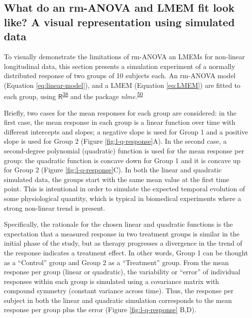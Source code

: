 \documentclass[
]{article}
\begin{document}
\hypertarget{simulation}{%
\subsection{What do an rm-ANOVA and LMEM fit look like? A visual representation using simulated data}\label{simulation}}

To visually demonstrate the limitations of rm-ANOVA an LMEMs for non-linear longitudinal data, this section presents a simulation experiment of a normally distributed response of two groups of 10 subjects each. An rm-ANOVA model (Equation \eqref{eq:linear-model}), and a LMEM (Equation \eqref{eq:LMEM}) are fitted to each group, using \(\textsf{R}\)\textsuperscript{\protect\hyperlink{ref-r}{38}} and the package \emph{nlme}.\textsuperscript{\protect\hyperlink{ref-nlme}{50}}

Briefly, two cases for the mean responses for each group are considered: in the first case, the mean response in each group is a linear function over time with different intercepts and slopes; a negative slope is used for Group 1 and a positive slope is used for Group 2 (Figure \ref{fig:l-q-response}A). In the second case, a second-degree polynomial (quadratic) function is used for the mean response per group: the quadratic function is concave down for Group 1 and it is concave up for Group 2 (Figure \ref{fig:l-q-response}C). In both the linear and quadratic simulated data, the groups start with the same mean value at the first time point. This is intentional in order to simulate the expected temporal evolution of some physiological quantity, which is typical in biomedical experiments where a strong non-linear trend is present.

Specifically, the rationale for the chosen linear and quadratic functions is the expectation that a measured response in two treatment groups is similar in the initial phase of the study, but as therapy progresses a divergence in the trend of the response indicates a treatment effect. In other words, Group 1 can be thought as a ``Control'' group and Group 2 as a ``Treatment'' group. From the mean response per group (linear or quadratic), the variability or ``error'' of individual responses within each group is simulated using a covariance matrix with compound symmetry (constant variance across time). Thus, the response per subject in both the linear and quadratic simulation corresponds to the mean response per group plus the error (Figure \ref{fig:l-q-response} B,D).
\end{document}
